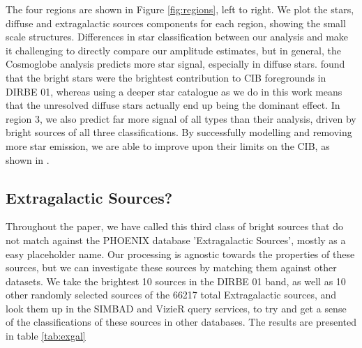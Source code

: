 \documentclass{aa}
\begin{document}
The four regions are shown in Figure \ref{fig:regions}, left to right. We plot the stars, diffuse and extragalactic sources components for each region, showing the small scale structures. Differences in star classification between our analysis and \cite{DIRBE2mass} make it challenging to directly compare our amplitude estimates, but in general, the Cosmoglobe analysis predicts more star signal, especially in diffuse stars. \cite{DIRBE2mass} found that the bright stars were the brightest contribution to CIB foregrounds in DIRBE 01, whereas using a deeper star catalogue as we do in this work means that the unresolved diffuse stars actually end up being the dominant effect. In region 3, we also predict far more signal of all types than their analysis, driven by bright sources of all three classifications. By successfully modelling and removing more star emission, we are able to improve upon their limits on the CIB, as shown in \cite{CG02_02}. 



\subsection{Extragalactic Sources?}

Throughout the paper, we have called this third class of bright sources that do not match against the PHOENIX database 'Extragalactic Sources', mostly as a easy placeholder name. Our processing is agnostic towards the properties of these sources, but we can investigate these sources by matching them against other datasets. We take the brightest 10 sources in the DIRBE 01 band, as well as 10 other randomly selected sources of the 66217 total Extragalactic sources, and look them up in the SIMBAD and VizieR query services, to try and get a sense of the classifications of these sources in other databases. The results are presented in table \ref{tab:exgal}
\end{document}
